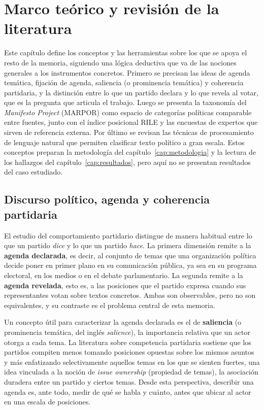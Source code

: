 \chapter{Marco teórico y revisión de la literatura}
\label{cap:marco-teorico}


Este capítulo define los conceptos y las herramientas sobre los que se apoya el
resto de la memoria, siguiendo una lógica deductiva que va de las nociones
generales a los instrumentos concretos. Primero se precisan las ideas de agenda
temática, fijación de agenda, saliencia (o prominencia temática) y coherencia
partidaria, y la distinción entre lo que un partido declara y lo que revela al
votar, que es la pregunta que articula el trabajo. Luego se presenta la taxonomía del \emph{Manifesto Project} (MARPOR)
como espacio de categorías políticas comparable entre fuentes, junto con el índice
posicional RILE y las encuestas de expertos que sirven de referencia externa.
Por último se revisan las técnicas de procesamiento de lenguaje natural que
permiten clasificar texto político a gran escala. Estos conceptos preparan la
metodología del capítulo~\ref{cap:metodologia} y la lectura de los hallazgos del
capítulo~\ref{cap:resultados}, pero aquí no se presentan resultados del caso
estudiado.

\section{Discurso político, agenda y coherencia partidaria}
\label{sec:discurso-coherencia}

El estudio del comportamiento partidario distingue de manera habitual entre lo
que un partido \emph{dice} y lo que un partido \emph{hace}. La primera dimensión
remite a la \textbf{agenda declarada}, es decir, al conjunto de temas que una
organización política decide poner en primer plano en su comunicación pública, ya
sea en su programa electoral, en los medios o en el debate parlamentario. La
segunda remite a la \textbf{agenda revelada}, esto es, a las posiciones que el
partido expresa cuando sus representantes votan sobre textos concretos. Ambas son
observables, pero no son equivalentes, y su contraste es el problema central de
esta memoria.

Un concepto útil para caracterizar la agenda declarada es el de \textbf{saliencia}
(o prominencia temática, del inglés \emph{salience}), la importancia relativa que
un actor otorga a cada tema. La literatura sobre
competencia partidaria sostiene que los partidos compiten menos tomando
posiciones opuestas sobre los mismos asuntos y más enfatizando selectivamente
aquellos temas en los que se sienten fuertes, una idea vinculada a la noción de
\emph{issue ownership} (propiedad de temas), la asociación duradera entre un
partido y ciertos temas.
Desde esta perspectiva, describir una agenda es, ante todo, medir de qué se habla
y cuánto, antes que ubicar al actor en una escala de posiciones.

